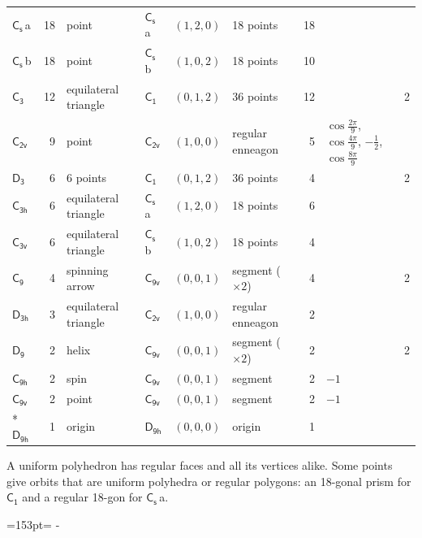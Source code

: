 \documentclass[10pt,a4paper]{article}
\newcommand{\needspace}[1]{\par\penalty-100\begingroup\dimen0=#1\relax\dimen2=\pagegoal
  \advance\dimen2-\pagetotal\ifdim\dimen0>\dimen2\relax\ifdim\dimen2>0pt\vfil\break\fi\fi
  \endgroup}
\numberwithin{equation}{section}
\newcommand{\grp}[1]{\mathsf{#1}}
\newcommand{\clsletter}[1]{\,{\scriptsize\color{black!55}#1}}
\newlength{\fillwidth}\newlength{\cellwidth}\newlength{\colwidth}
\begin{document}
{{\begin{longtable}{@{}lrllllr>{\RaggedRight\arraybackslash}p{\fillwidth}r@{}}
\href{C1v.pdf}{$\grp{C_{s}}$}\clsletter{a} & 18 & point & \href{C1v.pdf}{$\grp{C_{s}}$}\clsletter{a} & $(1, 2, 0)$ & 18 points & 18 &  & \\
\href{C1v.pdf}{$\grp{C_{s}}$}\clsletter{b} & 18 & point & \href{C1v.pdf}{$\grp{C_{s}}$}\clsletter{b} & $(1, 0, 2)$ & 18 points & 10 &  & \\
\href{C3.pdf}{$\grp{C_{3}}$} & 12 & equilateral triangle & \href{C1.pdf}{$\grp{C_{1}}$} & $(0, 1, 2)$ & 36 points & 12 &  & 2\\
\href{C2v.pdf}{$\grp{C_{2v}}$} & 9 & point & \href{C2v.pdf}{$\grp{C_{2v}}$} & $(1, 0, 0)$ & regular enneagon & 5 & ${\cos\tfrac{2\pi}{9}}$, ${\cos\tfrac{4\pi}{9}}$, ${-\tfrac{1}{2}}$, ${\cos\tfrac{8\pi}{9}}$ & \\
\href{D3.pdf}{$\grp{D_{3}}$} & 6 & 6 points & \href{C1.pdf}{$\grp{C_{1}}$} & $(0, 1, 2)$ & 36 points & 4 &  & 2\\
\href{C3h.pdf}{$\grp{C_{3h}}$} & 6 & equilateral triangle & \href{C1v.pdf}{$\grp{C_{s}}$}\clsletter{a} & $(1, 2, 0)$ & 18 points & 6 &  & \\
\href{C3v.pdf}{$\grp{C_{3v}}$} & 6 & equilateral triangle & \href{C1v.pdf}{$\grp{C_{s}}$}\clsletter{b} & $(1, 0, 2)$ & 18 points & 4 &  & \\
\href{C9.pdf}{$\grp{C_{9}}$} & 4 & spinning arrow & \href{C9v.pdf}{$\grp{C_{9v}}$} & $(0, 0, 1)$ & segment (${\times}2$) & 4 &  & 2\\
\href{D3h.pdf}{$\grp{D_{3h}}$} & 3 & equilateral triangle & \href{C2v.pdf}{$\grp{C_{2v}}$} & $(1, 0, 0)$ & regular enneagon & 2 &  & \\
\href{D9.pdf}{$\grp{D_{9}}$} & 2 & helix & \href{C9v.pdf}{$\grp{C_{9v}}$} & $(0, 0, 1)$ & segment (${\times}2$) & 2 &  & 2\\
\href{C9h.pdf}{$\grp{C_{9h}}$} & 2 & spin & \href{C9v.pdf}{$\grp{C_{9v}}$} & $(0, 0, 1)$ & segment & 2 & ${-1}$ & \\
\href{C9v.pdf}{$\grp{C_{9v}}$} & 2 & point & \href{C9v.pdf}{$\grp{C_{9v}}$} & $(0, 0, 1)$ & segment & 2 & ${-1}$ & \\*
\href{D9h.pdf}{$\grp{D_{9h}}$} & 1 & origin & \href{D9h.pdf}{$\grp{D_{9h}}$} & $(0, 0, 0)$ & origin & 1 &  & \\
\bottomrule\end{longtable}}}
A uniform polyhedron has regular faces and all its vertices alike. Some points give orbits that are uniform polyhedra or regular polygons: an 18-gonal prism for \href{C1.pdf}{$\grp{C_{1}}$} and a regular 18-gon for \href{C1v.pdf}{$\grp{C_{s}}$}\clsletter{a}.
\needspace{153pt}
\end{document}
